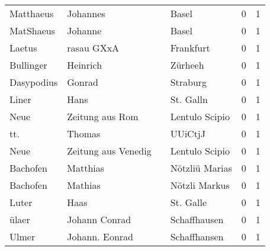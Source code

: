 \documentclass[10pt,a4paper,landscape]{article}
\begin{document}
\begin{longtable}{llllrr}
                Matthaeus &                           Johannes &             &                                       Basel &          0 &         1 \\
                MatShaeus &                            Johanne &             &                                       Basel &          0 &         1 \\
                   Laetus &                         rasau GXxA &             &                                   Frankfurt &          0 &         1 \\
                Bullinger &                           Heinrich &             &                                     Zürheeh &          0 &         1 \\
               Dasypodius &                             Gonrad &             &                                    Straburg &          0 &         1 \\
                    Liner &                               Hans &             &                                   St. Galln &          0 &         1 \\
                     Neue &                    Zeitung aus Rom &             &                              Lentulo Scipio &          0 &         1 \\
                      tt. &                             Thomas &             &                                     UUiCtjJ &          0 &         1 \\
                     Neue &                Zeitung aus Venedig &             &                              Lentulo Scipio &          0 &         1 \\
                 Bachofen &                           Matthias &             &                              Nötzliü Marias &          0 &         1 \\
                 Bachofen &                            Mathias &             &                               Nötzli Markus &          0 &         1 \\
                    Luter &                               Haas &             &                                   St. Galle &          0 &         1 \\
                    ülaer &                      Johann Conrad &             &                                Schaffhausen &          0 &         1 \\
                    Ulmer &                     Johann. Eonrad &             &                                Schaffhansen &          0 &         1 \\

\end{longtable}
\end{document}
